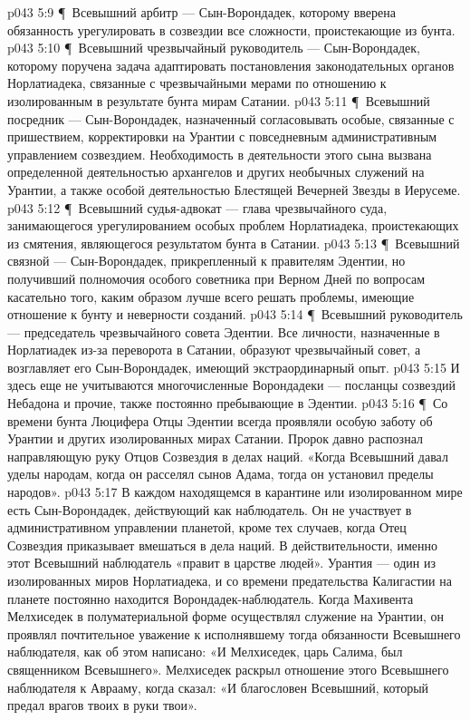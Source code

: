 \vs p043 5:9 \P\ \bibnobreakspace Всевышний арбитр --- Сын\hyp{}Ворондадек, которому вверена обязанность урегулировать в созвездии все сложности, проистекающие из бунта.
\vs p043 5:10 \P\ \bibnobreakspace Всевышний чрезвычайный руководитель --- Сын\hyp{}Ворондадек, которому поручена задача адаптировать постановления законодательных органов Норлатиадека, связанные с чрезвычайными мерами по отношению к изолированным в результате бунта мирам Сатании.
\vs p043 5:11 \P\ \bibnobreakspace Всевышний посредник --- Сын\hyp{}Ворондадек, назначенный согласовывать особые, связанные с пришествием, корректировки на Урантии с повседневным административным управлением созвездием. Необходимость в деятельности этого сына вызвана определенной деятельностью архангелов и других необычных служений на Урантии, а также особой деятельностью Блестящей Вечерней Звезды в Иерусеме.
\vs p043 5:12 \P\ \bibnobreakspace Всевышний судья\hyp{}адвокат --- глава чрезвычайного суда, занимающегося урегулированием особых проблем Норлатиадека, проистекающих из смятения, являющегося результатом бунта в Сатании.
\vs p043 5:13 \P\ \bibnobreakspace Всевышний связной --- Сын\hyp{}Ворондадек, прикрепленный к правителям Эдентии, но получивший полномочия особого советника при Верном Дней по вопросам касательно того, каким образом лучше всего решать проблемы, имеющие отношение к бунту и неверности созданий.
\vs p043 5:14 \P\ \bibnobreakspace Всевышний руководитель --- председатель чрезвычайного совета Эдентии. Все личности, назначенные в Норлатиадек из\hyp{}за переворота в Сатании, образуют чрезвычайный совет, а возглавляет его Сын\hyp{}Ворондадек, имеющий экстраординарный опыт.
\vs p043 5:15 И здесь еще не учитываются многочисленные Ворондадеки --- посланцы созвездий Небадона и прочие, также постоянно пребывающие в Эдентии.
\vs p043 5:16 \P\ Со времени бунта Люцифера Отцы Эдентии всегда проявляли особую заботу об Урантии и других изолированных мирах Сатании. Пророк давно распознал направляющую руку Отцов Созвездия в делах наций. «Когда Всевышний давал уделы народам, когда он расселял сынов Адама, тогда он установил пределы народов».
\vs p043 5:17 В каждом находящемся в карантине или изолированном мире есть Сын\hyp{}Ворондадек, действующий как наблюдатель. Он не участвует в административном управлении планетой, кроме тех случаев, когда Отец Созвездия приказывает вмешаться в дела наций. В действительности, именно этот Всевышний наблюдатель «правит в царстве людей». Урантия --- один из изолированных миров Норлатиадека, и со времени предательства Калигастии на планете постоянно находится Ворондадек\hyp{}наблюдатель. Когда Махивента Мелхиседек в полуматериальной форме осуществлял служение на Урантии, он проявлял почтительное уважение к исполнявшему тогда обязанности Всевышнего наблюдателя, как об этом написано: «И Мелхиседек, царь Салима, был священником Всевышнего». Мелхиседек раскрыл отношение этого Всевышнего наблюдателя к Аврааму, когда сказал: «И благословен Всевышний, который предал врагов твоих в руки твои».
